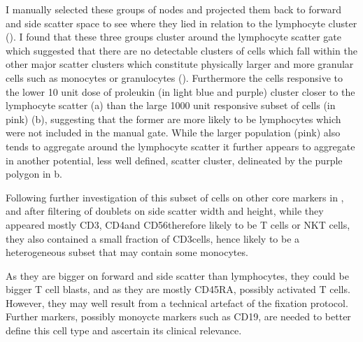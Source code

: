 I manually selected these groups of nodes and projected them back to forward and side scatter space to see where they lied in relation
to the lymphocyte cluster ().  
I found that these three groups cluster around the lymphocyte scatter gate which suggested that
there are no detectable clusters of cells which fall within the other major scatter clusters which constitute physically larger and more granular cells such as monocytes
or granulocytes ().
Furthermore the cells responsive to the lower 10 unit dose of proleukin (in light blue and purple) cluster closer to the lymphocyte scatter
(a)
than the large 1000 unit responsive subset of cells (in pink) (b),
suggesting that the former are more likely to be lymphocytes which were not included in the manual gate.
While the larger population (pink) also tends to aggregate around the lymphocyte scatter it
further appears to aggregate in another potential, less well defined, scatter cluster, delineated by the purple polygon in b.

Following further investigation of this subset of cells on other core markers in ,
and after filtering of doublets on side scatter width and height,
while they appeared mostly CD3\positive, CD4\positive and CD56\negative therefore likely to be T cells or NKT cells,
they also contained a small fraction of CD3\negative cells,
hence likely to be a heterogeneous subset that may contain some monocytes.

As they are bigger on forward and side scatter than lymphocytes,
they could be bigger T cell blasts, and as they are mostly CD45RA\positive,
possibly activated T cells.
However, they may well result from a technical artefact of the fixation protocol.
Further markers, possibly monoycte markers such as CD19, are needed to better define this cell type
and ascertain its clinical relevance.


